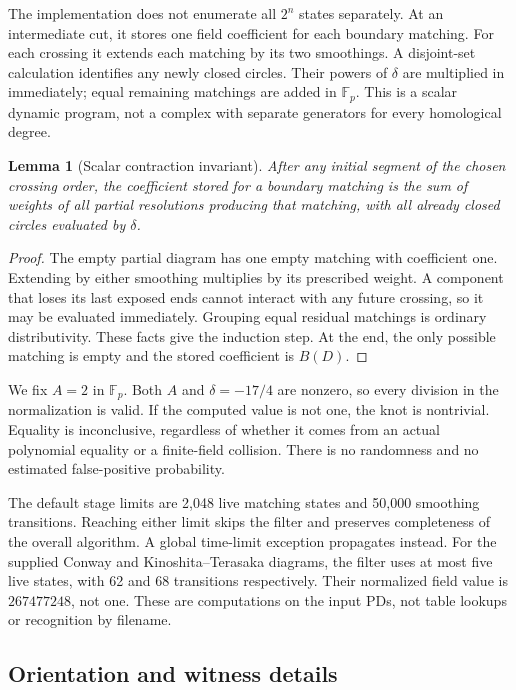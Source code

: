 \documentclass[11pt]{article}
\newtheorem{lemma}[proposition]{Lemma}
\newcommand{\F}{\mathbb F}
\begin{document}
The implementation does not enumerate all $2^n$ states separately. At an
intermediate cut, it stores one field coefficient for each boundary matching.
For each crossing it extends each matching by its two smoothings. A disjoint-set
calculation identifies any newly closed circles. Their powers of $\delta$
are multiplied in immediately; equal remaining matchings are added in $\F_p$.
This is a scalar dynamic program, not a complex with separate generators for
every homological degree.

\begin{lemma}[Scalar contraction invariant]
After any initial segment of the chosen crossing order, the coefficient
stored for a boundary matching is the sum of weights of all partial
resolutions producing that matching, with all already closed circles
evaluated by $\delta$.
\end{lemma}
\begin{proof}
The empty partial diagram has one empty matching with coefficient one.
Extending by either smoothing multiplies by its prescribed weight. A component
that loses its last exposed ends cannot interact with any future crossing, so
it may be evaluated immediately. Grouping equal residual matchings is ordinary
distributivity. These facts give the induction step. At the end, the only
possible matching is empty and the stored coefficient is $B(D)$.
\end{proof}

We fix $A=2$ in $\F_p$. Both $A$ and
$\delta=-17/4$ are nonzero, so every division in the normalization is valid.
If the computed value is not one, the knot is nontrivial. Equality is
inconclusive, regardless of whether it comes from an actual polynomial equality
or a finite-field collision. There is no randomness and no estimated
false-positive probability.

The default stage limits are 2,048 live matching states and 50,000 smoothing
transitions. Reaching either limit skips the filter and preserves completeness
of the overall algorithm. A global time-limit exception propagates instead.
For the supplied Conway and Kinoshita--Terasaka diagrams, the filter uses at most
five live states, with 62 and 68 transitions respectively. Their normalized
field value is $267477248$, not one. These are computations on the input PDs,
not table lookups or recognition by filename.

\subsection{Orientation and witness details}
\end{document}
